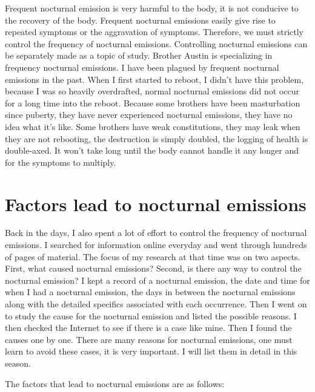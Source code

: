 \documentclass[
]{book}
\begin{document}
Frequent nocturnal emission is very harmful to the body, it is not conducive to the recovery of the body. Frequent nocturnal emissions easily give rise to repeated symptoms or the aggravation of symptoms. Therefore, we must strictly control the frequency of nocturnal emissions. Controlling nocturnal emissions can be separately made as a topic of study. Brother Austin is specializing in frequency nocturnal emissions. I have been plagued by frequent nocturnal emissions in the past. When I first started to reboot, I didn't have this problem, because I was so heavily overdrafted, normal nocturnal emissions did not occur for a long time into the reboot. Because some brothers have been masturbation since puberty, they have never experienced nocturnal emissions, they have no idea what it's like. Some brothers have weak constitutions, they may leak when they are not rebooting, the destruction is simply doubled, the logging of health is double-axed. It won't take long until the body cannot handle it any longer and for the symptoms to multiply.

\hypertarget{factors-lead-to-nocturnal-emissions}{%
\section{Factors lead to nocturnal emissions}\label{factors-lead-to-nocturnal-emissions}}

Back in the days, I also spent a lot of effort to control the frequency of nocturnal emissions. I searched for information online everyday and went through hundreds of pages of material. The focus of my research at that time was on two aspects. First, what caused nocturnal emissions? Second, is there any way to control the nocturnal emission? I kept a record of a nocturnal emission, the date and time for when I had a nocturnal emission, the days in between the nocturnal emissions along with the detailed specifics associated with each occurrence. Then I went on to study the cause for the nocturnal emission and listed the possible reasons. I then checked the Internet to see if there is a case like mine. Then I found the causes one by one. There are many reasons for nocturnal emissions, one must learn to avoid these cases, it is very important. I will list them in detail in this season.

The factors that lead to nocturnal emissions are as follows:
\end{document}

